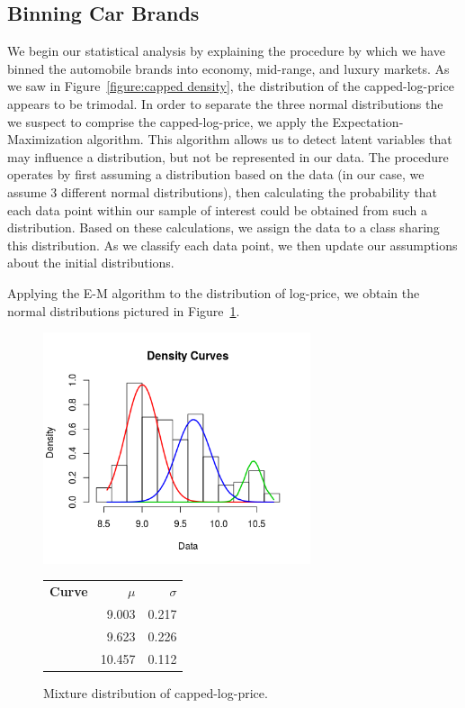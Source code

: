 \documentclass[a4paper, 10pt, titlepage]{article}
\begin{document}
\subsection{Binning Car Brands}
	We begin our statistical analysis by explaining the procedure by which we have binned the automobile brands into economy, mid-range, and luxury markets. As we saw in Figure~\ref{figure:capped density}, the distribution of the capped-log-price appears to be trimodal. In order to separate the three normal distributions the we suspect to comprise the capped-log-price, we apply the Expectation-Maximization algorithm. This algorithm allows us to detect latent variables that may influence a distribution, but not be represented in our data. The procedure operates by first assuming a distribution based on the data (in our case, we assume 3 different normal distributions), then calculating the probability that each data point within our sample of interest could be obtained from such a distribution. Based on these calculations, we assign the data to a class sharing this distribution. As we classify each data point, we then update our assumptions about the initial distributions.
	
	Applying the E-M algorithm to the distribution of log-price, we obtain the normal distributions pictured in Figure~\ref{figure:mixture dist}.
	
	\begin{figure}[!ht]
	\centering
	    \includegraphics[width = 0.7\textwidth]{mixturedist.png}
	    \\
	    \begin{tabular}{lrr}
	         \textbf{Curve} & \textbf{$\mu$} & \textbf{$\sigma$} \\
	         \color{red}{Red} & 9.003 & 0.217\\
 	         \color{blue}{Blue} & 9.623 & 0.226\\
	         \color{green}{Green} & 10.457 & 0.112 \\
	    \end{tabular}
	\caption{Mixture distribution of capped-log-price.}
	\label{figure:mixture dist}
    \end{figure}
    
\end{document}
